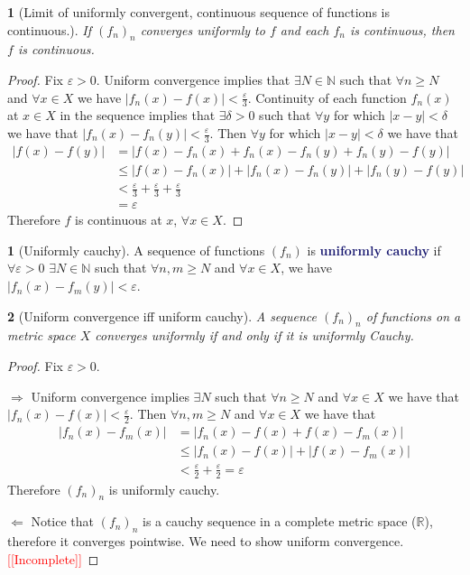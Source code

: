 \documentclass[12pt]{article}
\numberwithin{equation}{section}
\newcommand{\navy}[1]{\textcolor{MidnightBlue}{\bf #1}}
\theoremstyle{plain}
\newtheorem{theorem}{\color{ForestGreen}{\textbf{Theorem}}}[section]
\theoremstyle{definition}
\newtheorem{definition}{\color{MidnightBlue}{\textbf{Definition}}}[section]
\def\imp{\Rightarrow}
\def\pmi{\Leftarrow}
\newcommand{\1}{\mathbbm 1}
\def\d{\delta}
\newcommand{\e}{\varepsilon}
\newcommand{\RR}{\mathbb R}
\newcommand{\NN}{\mathbb N}
\begin{document}
\begin{theorem}[Limit of uniformly convergent, continuous sequence of functions is continuous.]
	If $(f_n)_n$ converges uniformly to $f$ and each $f_n$ is continuous, then $f$ is continuous.
\end{theorem}
\begin{proof}
	Fix $\e > 0$. Uniform convergence implies that $\exists N \in \NN$ such that $\forall n \geq N$ and $\forall x \in X$ we have $|f_n(x) - f(x)| < \frac{\e}{3}$. Continuity of each function $f_n(x)$ at $x \in X$ in the sequence implies that $\exists \d > 0$ such that $\forall y$ for which $|x - y| < \d$ we have that $|f_n(x) - f_n(y)| < \frac{\e}{3}$. Then $\forall y$ for which $|x - y| < \d$ we have that
	\begin{align*}
		|f(x) - f(y)| &= |f(x)- f_n(x) + f_n(x) - f_n(y) + f_n(y) - f(y)| \\
		&\leq |f(x)- f_n(x)| + |f_n(x) - f_n(y)| + |f_n(y) - f(y)| \tag{$\Delta$} \\
		&< \frac{\e}{3} + \frac{\e}{3} + \frac{\e}{3} \tag{uniform convergence and continuity of $f_n$ at $x$} \\
		&= \e
	\end{align*}
	Therefore $f$ is continuous at $x$, $\forall x \in X$.   
\end{proof}

\begin{definition}[Uniformly cauchy]
	A sequence of functions $(f_n)$ is \navy{uniformly cauchy} if $\forall \e > 0$ $\exists N \in \NN$ such that $\forall n,m \geq N$ and $\forall x \in X$, we have $|f_n(x) - f_m(y)| < \e$. 
\end{definition}


\begin{theorem}[Uniform convergence iff uniform cauchy]
	A sequence $(f_n)_n$ of functions on a metric space $X$ converges uniformly if and only if it is uniformly Cauchy.
\end{theorem}
\begin{proof} Fix $\e > 0$.

	$\imp$ Uniform convergence implies $\exists N$ such that $\forall n \geq N$ and $\forall x \in X$ we have that $|f_n(x)-f(x)|<\frac{\e}{2}$. Then $\forall n,m \geq N$ and $\forall x \in X$ we have that
	\begin{align*}
		|f_n(x) - f_m(x)| &= |f_n(x) - f(x) + f(x) - f_m(x)| \\
		&\leq |f_n(x) - f(x)| + |f(x) - f_m(x)| \\
		&< \frac{\e}{2} + \frac{\e}{2} = \e
	\end{align*}
	Therefore $(f_n)_n$ is uniformly cauchy. 

	$\pmi$ Notice that $(f_n)_n$ is a cauchy sequence in a complete metric space ($\RR$), therefore it converges pointwise. We need to show uniform convergence. \textcolor{red}{[[Incomplete]]}
\end{proof}
\end{document}
